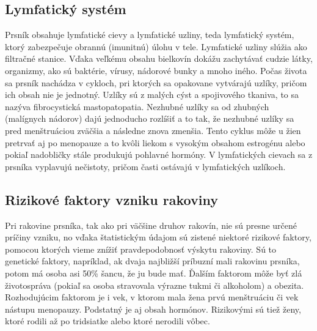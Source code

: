 \subsection{Lymfatický systém }
\hspace{10mm}Prsník obsahuje lymfatické cievy a lymfatické uzliny, teda lymfatický systém, ktorý zabezpečuje obrannú (imunitnú) úlohu v tele. Lymfatické uzliny slúžia ako filtračné stanice. Vďaka veľkému obsahu bielkovín dokážu zachytávať cudzie látky, organizmy,  ako sú baktérie, vírusy, nádorové bunky a mnoho iného. Počas života sa prsník nachádza v cykloch, pri ktorých sa opakovane vytvárajú uzlíky, pričom ich obsah nie je jednotný. Uzlíky sú z malých cýst a spojivového tkaniva, to sa nazýva fibrocystická mastopatopatia. Nezhubné uzlíky sa od zhubných (malígnych nádorov) dajú jednoducho rozlíšiť a to tak, že nezhubné uzlíky sa pred menštruáciou zväčšia a následne znova zmenšia. Tento cyklus môže u žien pretrvať aj po menopauze a to kvôli liekom s vysokým obsahom estrogénu alebo pokiaľ nadobličky stále produkujú pohlavné hormóny. V lymfatických cievach sa  z prsníka vyplavujú nečistoty, pričom časti ostávajú v lymfatických uzlíkoch. 


\subsection{Rizikové faktory vzniku rakoviny}
\hspace{10mm}Pri rakovine prsníka, tak ako pri väčšine druhov rakovín, nie sú presne určené príčiny vzniku, no vďaka štatistickým údajom sú zistené niektoré rizikové faktory, pomocou ktorých vieme znížiť pravdepodobnosť výskytu rakoviny. Sú to genetické faktory, napríklad, ak dvaja najbližší príbuzní mali rakovinu prsníka, potom má osoba asi 50\% šancu, že ju bude mať. Ďalším faktorom môže byť zlá životospráva (pokiaľ sa osoba stravovala výrazne tukmi či alkoholom)  a obezita. Rozhodujúcim faktorom je i vek, v ktorom mala žena prvú menštruáciu či  vek nástupu menopauzy. Podstatný je aj obsah hormónov. Rizikovými sú tiež ženy, ktoré rodili až po tridsiatke alebo ktoré nerodili vôbec.

